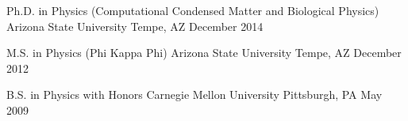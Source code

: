 

\begin{cventries}

  \cventry
    {Ph.D. in Physics (Computational Condensed Matter and Biological Physics) }%
    {Arizona State University} %
    {Tempe, AZ} %
    {December 2014} %
    {}\vspace{-1\baselineskip}
    
 \cventry
    {M.S. in Physics (Phi Kappa Phi)} %
    {Arizona State University} %
    {Tempe, AZ} %
    {December 2012} %
    {}\vspace{-1\baselineskip}
    
  \cventry
    {B.S. in Physics with Honors} %
    {Carnegie Mellon University} %
    {Pittsburgh, PA} %
    {May 2009} %
    {}
    \vspace{-1\baselineskip}

\end{cventries}
